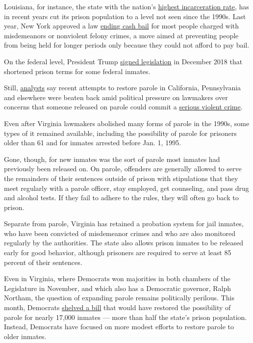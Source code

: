 Louisiana, for instance, the state with the nation's
\href{http://worldpopulationreview.com/states/prison-population-by-state/}{highest
incarceration rate}, has in recent years cut its prison population to a
level not seen since the 1990s. Last year, New York approved a law
\href{https://www.brennancenter.org/our-work/analysis-opinion/new-yorks-upcoming-bail-reform-changes-explained}{ending
cash bail} for most people charged with misdemeanors or nonviolent
felony crimes, a move aimed at preventing people from being held for
longer periods only because they could not afford to pay bail.

On the federal level, President Trump
\href{https://www.whitehouse.gov/briefings-statements/president-donald-j-trump-committed-building-successes-first-step-act/}{signed
legislation} in December 2018 that shortened prison terms for some
federal inmates.

Still,
\href{https://www.nytimes3xbfgragh.onion/2017/08/08/opinion/violent-offender-parole-sentencing-reform.html}{analysts}
say recent attempts to restore parole in California, Pennsylvania and
elsewhere were beaten back amid political pressure on lawmakers over
concerns that someone released on parole could commit a
\href{https://people.com/crime/man-out-on-parole-allegedly-strangled-honors-student-in-parking-garage-when-she-ignored-catcalls/}{serious
violent crime}.

Even after Virginia lawmakers abolished many forms of parole in the
1990s, some types of it remained available, including the possibility of
parole for prisoners older than 61 and for inmates arrested before Jan.
1, 1995.

Gone, though, for new inmates was the sort of parole most inmates had
previously been released on. On parole, offenders are generally allowed
to serve the remainders of their sentences outside of prison with
stipulations that they meet regularly with a parole officer, stay
employed, get counseling, and pass drug and alcohol tests. If they fail
to adhere to the rules, they will often go back to prison.

Separate from parole, Virginia has retained a probation system for jail
inmates, who have been convicted of misdemeanor crimes and who are also
monitored regularly by the authorities. The state also allows prison
inmates to be released early for good behavior, although prisoners are
required to serve at least 85 percent of their sentences.

Even in Virginia, where Democrats won majorities in both chambers of the
Legislature in November, and which also has a Democratic governor, Ralph
Northam, the question of expanding parole remains politically perilous.
This month, Democrats
\href{http://lis.virginia.gov/cgi-bin/legp604.exe?201+sum+SB91}{shelved
a bill} that would have restored the possibility of parole for nearly
17,000 inmates --- more than half the state's prison population.
Instead, Democrats have focused on more modest efforts to restore parole
to older inmates.

